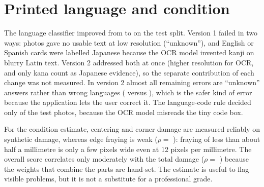 \section{Printed language and condition}

The language classifier improved from  to  on the test split. Version 1 failed in two ways:  photos gave no usable text at low resolution (``unknown''), and  English or Spanish cards were labelled Japanese because the OCR model invented kanji on blurry Latin text. Version 2 addressed both at once (higher resolution for OCR, and only kana count as Japanese evidence), so the separate contribution of each change was not measured. In version 2 almost all remaining errors are ``unknown'' answers rather than wrong languages ( versus ), which is the safer kind of error because the application lets the user correct it. The language-code rule decided only  of the  test photos, because the OCR model misreads the tiny code box.

For the condition estimate, centering and corner damage are measured reliably on synthetic damage, whereas edge fraying is weak ($\rho=$ ): fraying of less than about half a millimetre is only a few pixels wide even at 12 pixels per millimetre. The overall score correlates only moderately with the total damage ($\rho=$ ) because the weights that combine the parts are hand-set. The estimate is useful to flag visible problems, but it is not a substitute for a professional grade.
